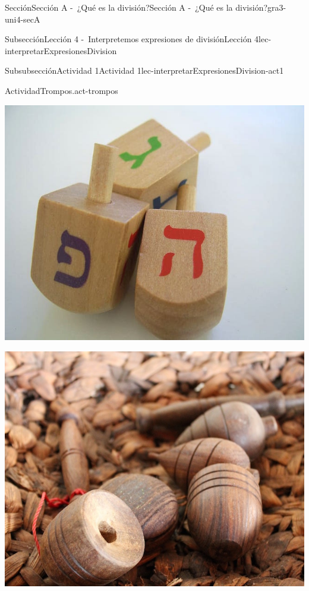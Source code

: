 \documentclass[twoside,10pt,]{article}
\begin{document}
\begin{sectionptx}{Sección}{Sección A -~¿Qué es la división?}{}{Sección A -~¿Qué es la división?}{}{}{gra3-uni4-secA}
\begin{subsectionptx}{Subsección}{Lección 4 -~Interpretemos expresiones de división}{}{Lección 4}{}{}{lec-interpretarExpresionesDivision}
\begin{subsubsectionptx}{Subsubsección}{Actividad 1}{}{Actividad 1}{}{}{lec-interpretarExpresionesDivision-act1}
\begin{activity}{Actividad}{Trompos.}{act-trompos}
\begin{sidebyside}{5}{0}{0}{0}
\begin{sbspanel}{0.2}
\includegraphics[width=\linewidth]{external/jpg-source/V1 3.4.A.4 Dreidels.jpg}
\end{sbspanel}%
\begin{sbspanel}{0.2}%
\includegraphics[width=\linewidth]{external/jpg-source/V1 3.4.A.4 Indonesian Gasing.jpg}
\end{sbspanel}%
\begin{sbspanel}{0.2}%

\end{sbspanel}
\end{sidebyside}
\end{activity}
\end{subsubsectionptx}
\end{subsectionptx}
\end{sectionptx}
\end{document}
